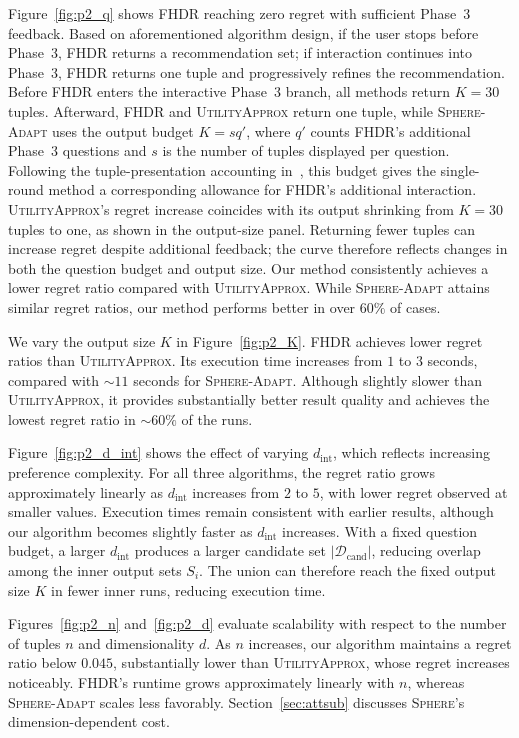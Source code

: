 Figure~\ref{fig:p2_q} shows FHDR reaching zero regret with sufficient Phase~3 feedback. Based on aforementioned algorithm design, if the user stops before Phase~3, FHDR returns a recommendation set; if interaction continues into Phase~3, FHDR returns one tuple and progressively refines the recommendation. Before FHDR enters the interactive Phase~3 branch, all methods return $K=30$ tuples. Afterward, FHDR and \textsc{UtilityApprox} return one tuple, while \textsc{Sphere-Adapt} uses the output budget $K=sq'$, where $q'$ counts FHDR’s additional Phase~3 questions and $s$ is the number of tuples displayed per question. Following the tuple-presentation accounting in~\cite{XCL19}, this budget gives the single-round method a corresponding allowance for FHDR’s additional interaction. \textsc{UtilityApprox}'s regret increase coincides with its output shrinking from $K=30$ tuples to one, as shown in the output-size panel. Returning fewer tuples can increase regret despite additional feedback; the curve therefore reflects changes in both the question budget and output size. Our method consistently achieves a lower regret ratio compared with \textsc{UtilityApprox}. While \textsc{Sphere-Adapt} attains similar regret ratios, our method performs better in over $60\%$ of cases.

We vary the output size $K$ in Figure~\ref{fig:p2_K}. FHDR achieves lower regret ratios than \textsc{UtilityApprox}. Its execution time increases from $1$ to $3$ seconds, compared with $\sim11$ seconds for \textsc{Sphere-Adapt}. Although slightly slower than \textsc{UtilityApprox}, it provides substantially better result quality and achieves the lowest regret ratio in $\sim60\%$ of the runs.

Figure~\ref{fig:p2_d_int} shows the effect of varying $d_\text{int}$, which reflects increasing preference complexity. For all three algorithms, the regret ratio grows approximately linearly as $d_\text{int}$ increases from $2$ to $5$, with lower regret observed at smaller values. Execution times remain consistent with earlier results, although our algorithm becomes slightly faster as $d_\text{int}$ increases. With a fixed question budget, a larger $d_\text{int}$ produces a larger candidate set $|\mathcal{D}_\text{cand}|$, reducing overlap among the inner output sets $S_i$. The union can therefore reach the fixed output size $K$ in fewer inner runs, reducing execution time.

Figures~\ref{fig:p2_n} and~\ref{fig:p2_d} evaluate scalability with respect to the number of tuples $n$ and dimensionality $d$. As $n$ increases, our algorithm maintains a regret ratio below $0.045$, substantially lower than \textsc{UtilityApprox}, whose regret increases noticeably. FHDR's runtime grows approximately linearly with $n$, whereas \textsc{Sphere-Adapt} scales less favorably. Section~\ref{sec:attsub} discusses \textsc{Sphere}'s dimension-dependent cost.

